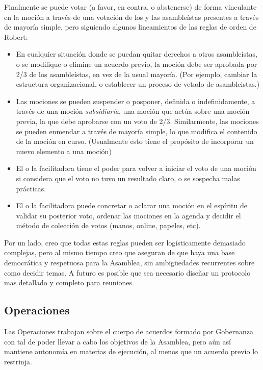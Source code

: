 \documentclass[justified]{tufte-handout} %
\begin{document}
Finalmente se puede votar (a favor, en contra, o abstenerse) de forma vinculante en la moción a través de una votación de los y las asambleístas presentes a través de mayoría simple, pero siguiendo algunos lineamientos de las reglas de orden de Robert\cite{robertrules}:
\begin{itemize}
	\item En cualquier situación donde se puedan quitar derechos a otros asambleístas, o se modifique o elimine un acuerdo previo, la moción debe ser aprobada por 2/3 de los asambleístas, en vez de la usual mayoría. (Por ejemplo, cambiar la estructura organizacional, o establecer un proceso de vetado de asambleistas.)
	\item Las mociones se pueden suspender o posponer, definida o indefinidamente, a través de una moción \textit{subsidiaria}, una moción que actúa sobre una moción previa, la que debe aprobarse con un voto de 2/3. Similarmente, las mociones se pueden enmendar a través de mayoría simple, lo que modifica el contenido de la moción en curso. (Usualmente esto tiene el propósito de incorporar un nuevo elemento a una moción)
	\item El o la facilitadora tiene el poder para volver a iniciar el voto de una moción si considera que el voto no tuvo un resultado claro, o se sospecha malas prácticas.
	\item El o la facilitadora puede concretar o aclarar una moción en el espíritu de validar su posterior voto, ordenar las mociones en la agenda y decidir el método de colección de votos (manos, online, papeles, etc).
\end{itemize}

Por un lado, creo que todas estas reglas pueden ser logísticamente demasiado complejas, pero al mismo tiempo creo que aseguran de que haya una base democrática y respetuosa para la Asamblea, sin ambigüedades recurrentes sobre como decidir temas. A futuro es posible que sea necesario diseñar un protocolo mas detallado y completo para reuniones.

\subsection{Operaciones}
Las Operaciones trabajan sobre el cuerpo de acuerdos formado por Gobernanza con tal de poder llevar a cabo los objetivos de la Asamblea, pero aún así mantiene autonomía en materias de ejecución, al menos que un acuerdo previo lo restrinja.
\end{document}
